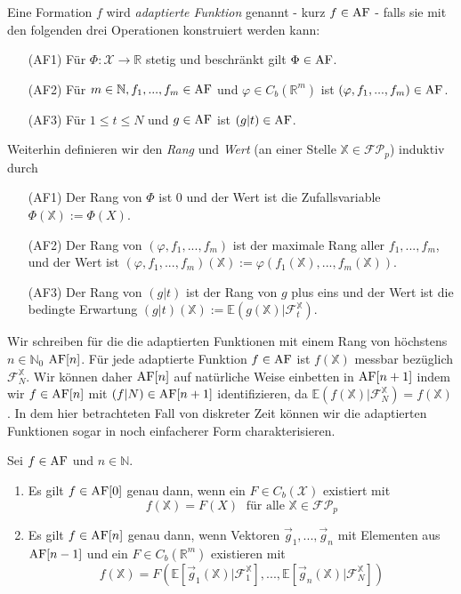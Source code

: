 \begin{definition}
Eine Formation $f$ wird \emph{adaptierte Funktion} genannt - kurz $f \in \operatorname{AF}$ - falls sie mit den folgenden drei Operationen konstruiert werden kann:
\begin{enumerate}
    \item[(AF1)] Für $\Phi: \mathcal{X} \rightarrow \mathbb{R}$ stetig und beschränkt gilt $\Phi \in \operatorname{AF}$.
    \item[(AF2)] Für $m \in \mathbb{N}, f_1,...,f_m \in \operatorname{AF}$ und $\varphi \in C_b(\mathbb{R}^m)$ ist $(\varphi, f_1, ..., f_m) \in \operatorname{AF}$.
    \item[(AF3)] Für $1\leq t \leq N$ und $g \in \operatorname{AF}$ ist $(g \vert t) \in \operatorname{AF}$.
\end{enumerate}
Weiterhin definieren wir den \emph{Rang} und \emph{Wert} (an einer Stelle $\mathbb{X} \in \mathcal{FP}_p$) induktiv durch 
\begin{enumerate}
    \item[(AF1)] Der Rang von $\Phi$ ist $0$ und der Wert ist die Zufallsvariable $\Phi(\mathbb{X}):=\Phi(X)$.
    \item[(AF2)] Der Rang von $(\varphi, f_1,...,f_m)$ ist der maximale Rang aller $f_1,...,f_m$, und der Wert ist $(\varphi, f_1,...,f_m)(\mathbb{X}):=\varphi(f_1(\mathbb{X}), ..., f_m(\mathbb{X}))$.
    \item[(AF3)] Der Rang von $(g \vert t)$ ist der Rang von $g$ plus eins und der Wert ist die bedingte Erwartung $(g\vert t)(\mathbb{X}) := \mathbb{E}(g(\mathbb{X}) \vert \mathcal{F}_t^\mathbb{X})$.
\end{enumerate}
\end{definition}
Wir schreiben für die die adaptierten Funktionen mit einem Rang von höchstens $n \in \mathbb{N}_0$ $\operatorname{AF}[n]$. Für jede adaptierte Funktion $f \in \operatorname{AF}$ ist $f(\mathbb{X})$ messbar bezüglich $\mathcal{F}_N^\mathbb{X}$. Wir können daher $\operatorname{AF}[n]$ auf natürliche Weise einbetten in $\operatorname{AF}[n+1]$ indem wir $f \in \operatorname{AF}[n]$ mit $(f \vert N) \in \operatorname{AF}[n+1]$ identifizieren, da $\mathbb{E}(f(\mathbb{X}) \vert \mathcal{F}_N^\mathbb{X}) = f(\mathbb{X})$. In dem hier betrachteten Fall von diskreter Zeit können wir die adaptierten Funktionen sogar in noch einfacherer Form charakterisieren.
\begin{lemma}\label{thm:adapted_functions_char}
Sei $f \in \operatorname{AF}$ und $n \in \mathbb{N}$. 
\begin{enumerate}
    \item Es gilt $f \in \operatorname{AF}[0]$ genau dann, wenn ein $F \in C_b(\mathcal{X})$ existiert mit 
    $$f(\mathbb{X}) = F(X)\; \text{ für alle } \mathbb{X} \in \mathcal{FP}_p$$ 
    \item Es gilt $f \in \operatorname{AF}[n]$ genau dann, wenn Vektoren $\vec{g}_1,...,\vec{g}_n$ mit Elementen aus $\operatorname{AF}[n-1]$ und ein $F \in C_b(\mathbb{R}^m)$ existieren mit 
    $$f(\mathbb{X}) = F(\mathbb{E}[\vec{g}_1(\mathbb{X}) \vert \mathcal{F}_1^\mathbb{X}], ..., \mathbb{E}[\vec{g}_n(\mathbb{X}) \vert \mathcal{F}_N^{\mathbb{X}}])$$
\end{enumerate}
\end{lemma}
